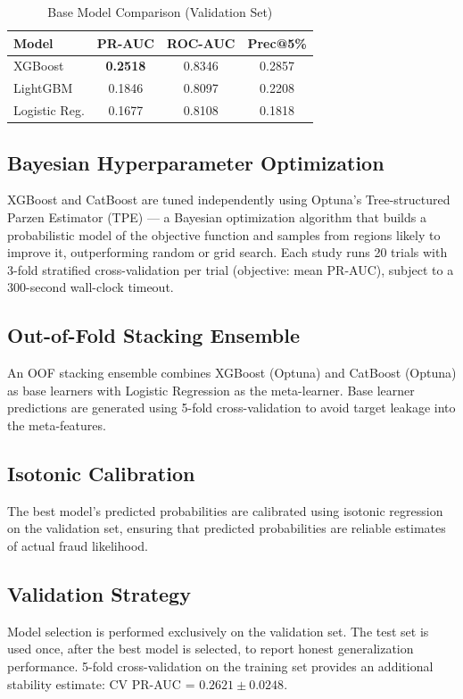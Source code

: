 \documentclass[10pt,twocolumn]{article}
\begin{document}
\begin{table}[h]
\centering
\caption{Base Model Comparison (Validation Set)}
\small
\begin{tabular}{lccc}
\toprule
\textbf{Model} & \textbf{PR-AUC} & \textbf{ROC-AUC} & \textbf{Prec@5\%} \\
\midrule
XGBoost        & \textbf{0.2518} & 0.8346 & 0.2857 \\
LightGBM       & 0.1846          & 0.8097 & 0.2208 \\
Logistic Reg.  & 0.1677          & 0.8108 & 0.1818 \\
\bottomrule
\end{tabular}
\end{table}

\subsection{Bayesian Hyperparameter Optimization}
XGBoost and CatBoost are tuned independently using Optuna's Tree-structured Parzen Estimator (TPE) \cite{optuna} --- a Bayesian optimization algorithm that builds a probabilistic model of the objective function and samples from regions likely to improve it, outperforming random or grid search. Each study runs 20 trials with 3-fold stratified cross-validation per trial (objective: mean PR-AUC), subject to a 300-second wall-clock timeout.

\subsection{Out-of-Fold Stacking Ensemble}
An OOF stacking ensemble combines XGBoost (Optuna) and CatBoost (Optuna) as base learners with Logistic Regression as the meta-learner. Base learner predictions are generated using 5-fold cross-validation to avoid target leakage into the meta-features.

\subsection{Isotonic Calibration}
The best model's predicted probabilities are calibrated using isotonic regression on the validation set, ensuring that predicted probabilities are reliable estimates of actual fraud likelihood.

\subsection{Validation Strategy}
Model selection is performed exclusively on the validation set. The test set is used once, after the best model is selected, to report honest generalization performance. 5-fold cross-validation on the training set provides an additional stability estimate: CV PR-AUC = $0.2621 \pm 0.0248$.
\end{document}
